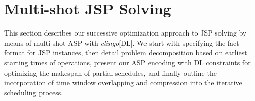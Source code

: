 \documentclass{tlp} %
\newcommand{\clingodl}{\emph{clingo}[DL]\xspace}
\begin{document}
\section{Multi-shot JSP Solving}\label{sec:problem}
This section describes our successive optimization approach to
JSP solving by means of multi-shot ASP with \clingodl.
We start with specifying the fact format for JSP instances,
then detail problem decomposition based on earliest starting times of operations,
present our ASP encoding with DL constraints for optimizing the makespan of partial schedules, and
finally outline the incorporation of time window overlapping and compression
into the iterative scheduling process.   
%
\end{document}
